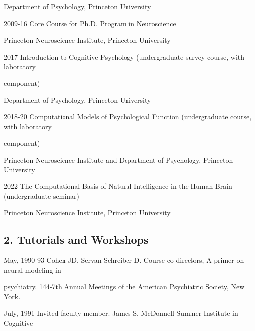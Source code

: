 \documentclass[10 pt]{article}
\begin{document}
\hspace{0.81in} Department of Psychology, Princeton University
    \smallskip

2009-16 \hspace{0.3in} Core Course for Ph.D. Program in Neuroscience

\hspace{0.81in} Princeton Neuroscience Institute, Princeton University
    \smallskip

2017 \hspace{0.48in} Introduction to Cognitive Psychology (undergraduate survey course, with laboratory

\hspace{0.81in} component)

\hspace{0.81in} Department of Psychology, Princeton University
    \smallskip

2018-20 \hspace{0.3in} Computational Models of Psychological Function (undergraduate course, with laboratory

\hspace{0.81in} component)

\hspace{0.81in} Princeton Neuroscience Institute and Department of Psychology, Princeton University
    \smallskip

2022 \hspace{0.51in} The Computational Basis of Natural Intelligence in the Human Brain (undergraduate seminar)

\hspace{0.81in} Princeton Neuroscience Institute, Princeton University
    \smallskip

\subsection*{2. Tutorials and Workshops} \label{secTEACHING2}
    \medskip

May, 1990-93 \hspace{0.25in} Cohen JD, Servan-Schreiber D. Course co-directors, A primer on neural modeling in

\hspace{1.1in} psychiatry. 144-7th Annual Meetings of the American Psychiatric Society, New York.

July, 1991 \hspace{0.44in} Invited faculty member. James S. McDonnell Summer Institute in Cognitive
\end{document}
